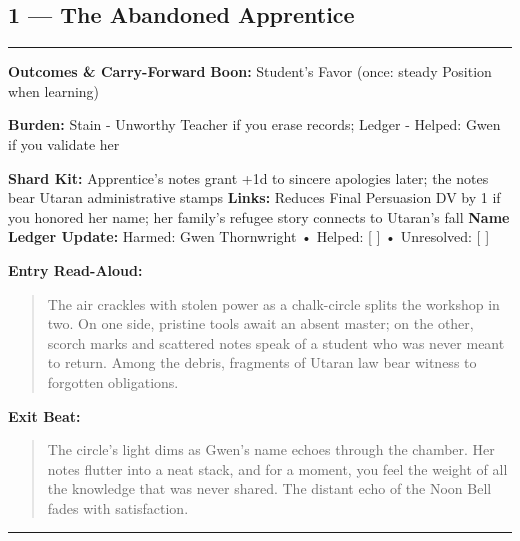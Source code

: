 \documentclass[18pt, letterpaper, twoside]{article}
\newenvironment{floorbox}[1]{%
    \begin{center}
    \begin{minipage}{0.95\textwidth}
    \subsection*{#1}
    \vspace{-0.5em}
    \rule{\textwidth}{0.5pt}
    \vspace{0.5em}
}{%
    \vspace{0.5em}
    \rule{\textwidth}{0.5pt}
    \end{minipage}
    \end{center}
}
\newenvironment{boxedtext}[1]{%
    \vspace{0.5em}
    \noindent\textbf{#1}
    \begin{quote}
}{%
    \end{quote}
    \vspace{0.5em}
}
\newcommand{\boon}[1]{\noindent\textbf{Boon:} #1\par}
\newcommand{\burden}[1]{\noindent\textbf{Burden:} #1\par}
\newcommand{\entrytext}[1]{\begin{boxedtext}{Entry Read-Aloud:} #1 \end{boxedtext}}
\newcommand{\exittext}[1]{\begin{boxedtext}{Exit Beat:} #1 \end{boxedtext}}
\begin{document}
\begin{floorbox}{1 --- The Abandoned Apprentice}
\textbf{Outcomes \& Carry-Forward}
\boon{Student's Favor (once: steady Position when learning)}
\burden{Stain - Unworthy Teacher if you erase records; Ledger - Helped: Gwen if you validate her}
\textbf{Shard Kit:} Apprentice's notes grant +1d to sincere apologies later; the notes bear Utaran administrative stamps
\textbf{Links:} Reduces Final Persuasion DV by 1 if you honored her name; her family's refugee story connects to Utaran's fall
\textbf{Name Ledger Update:} Harmed: Gwen Thornwright • Helped: [ ] • Unresolved: [ ]

\entrytext{The air crackles with stolen power as a chalk-circle splits the workshop in two. On one side, pristine tools await an absent master; on the other, scorch marks and scattered notes speak of a student who was never meant to return. Among the debris, fragments of Utaran law bear witness to forgotten obligations.}

\exittext{The circle's light dims as Gwen's name echoes through the chamber. Her notes flutter into a neat stack, and for a moment, you feel the weight of all the knowledge that was never shared. The distant echo of the Noon Bell fades with satisfaction.}
\end{floorbox}
\end{document}
